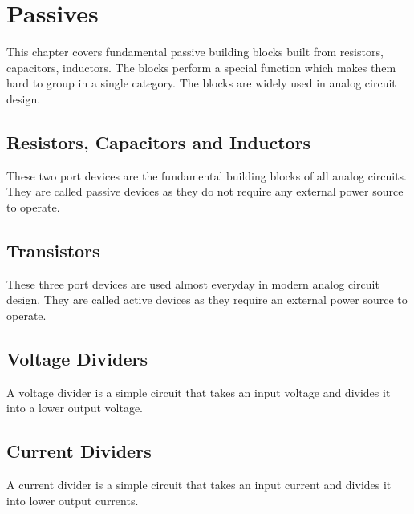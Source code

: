 \chapter{Passives}

This chapter covers fundamental passive building blocks
built from resistors, capacitors, inductors. The blocks
perform a special function which makes them hard to group
in a single category. The blocks are widely used in
analog circuit design.

\section{Resistors, Capacitors and Inductors}
These two port devices are the fundamental building blocks of
all analog circuits. They are called passive devices as they do
not require any external power source to operate.



\section{Transistors}
These three port devices are used almost everyday in modern analog
circuit design. They are called active devices as they require
an external power source to operate.



\section{Voltage Dividers}
A voltage divider is a simple circuit that takes an input
voltage and divides it into a lower output voltage.





\section{Current Dividers}
A current divider is a simple circuit that takes an input
current and divides it into lower output currents.





